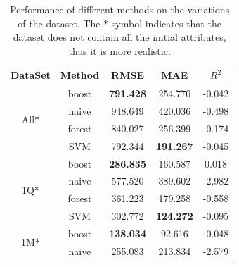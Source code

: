 \documentclass[conference,compsoc]{IEEEtran}
\begin{document}
\begin{table}[!t]
	
	\renewcommand{\arraystretch}{1.3}
	\label{model_performance}
	\centering
	\caption{Performance of different methods on the variations of the dataset. The $*$ symbol indicates that the dataset does not contain all the initial attributes, thus it is more realistic.}
	\begin{tabular}{c|c|c|c|c}
		DataSet & Method & RMSE & MAE & $R^2$ \\
		\hline
		\multirow{4}{*}{All*}
		& boost & \textbf{791.428} & 254.770 & -0.042 \\
		& naive & 948.649 & 420.036 & -0.498 \\
		& forest & 840.027 & 256.399 & -0.174 \\
		& SVM & 792.344 & \textbf{191.267} & -0.045 \\
		\hline
		\multirow{4}{*}{1Q*}
		& boost & \textbf{286.835} & 160.587 & 0.018 \\
		& naive & 577.520 & 389.602 & -2.982 \\
		& forest & 361.223 & 179.258 & -0.558 \\
		& SVM & 302.772 & \textbf{124.272} & -0.095 \\
		\hline
		\multirow{4}{*}{1M*}
		& boost & \textbf{138.034} & 92.616 & -0.048 \\
		& naive & 255.083 & 213.834 & -2.579 \\

\end{tabular}
\end{table}
\end{document}
